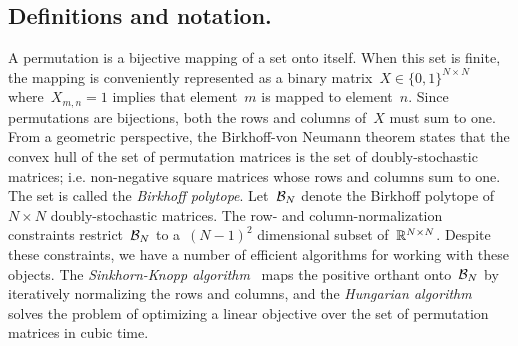 \documentclass[twoside]{article}
\begin{document}
\subsection{Definitions and notation.}  A permutation is a bijective
mapping of a set onto itself.  When this set is finite, the mapping is
conveniently represented as a binary
matrix~${X \in \{0,1\}^{N \times N}}$ where~${X_{m,n}=1}$ implies that
element~$m$ is mapped to element~$n$.  Since permutations are
bijections, both the rows and columns of~$X$ must sum to one.  From a
geometric perspective, the Birkhoff-von Neumann theorem states that
the convex hull of the set of permutation matrices is the set of
doubly-stochastic matrices; i.e. non-negative square matrices whose
rows and columns sum to one. The set is called the \emph{Birkhoff
  polytope}.  Let~$\mathcal{B}_N$ denote the Birkhoff polytope of~$N \times N$
doubly-stochastic matrices.
The row- and column-normalization constraints
restrict~$\mathcal{B}_N$ to a~${(N-1)^2}$ dimensional subset
of~$\mathbb{R}^{N \times N}$.  Despite these constraints, we have a number
of efficient algorithms for working with these objects.  The
\emph{Sinkhorn-Knopp algorithm}~\citep{sinkhorn1967concerning}
maps the positive orthant onto~$\mathcal{B}_N$ by iteratively normalizing
the rows and columns, and the \emph{Hungarian
  algorithm}~\citep{kuhn1955hungarian, munkres1957algorithms} solves
the problem of optimizing a linear
objective over the set of permutation matrices in cubic time.
\end{document}
